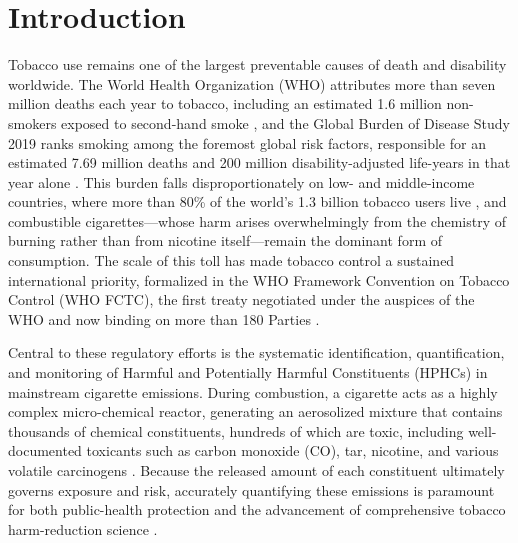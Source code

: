 ﻿\documentclass[a4paper,fleqn]{cas-sc}
\begin{document}
\maketitle


\section{Introduction}

Tobacco use remains one of the largest preventable causes of death and disability worldwide. The World Health Organization (WHO) attributes more than seven million deaths each year to tobacco, including an estimated 1.6 million non-smokers exposed to second-hand smoke \cite{who2025tobacco}, and the Global Burden of Disease Study 2019 ranks smoking among the foremost global risk factors, responsible for an estimated 7.69 million deaths and 200 million disability-adjusted life-years in that year alone \cite{gbd2019tobacco}. This burden falls disproportionately on low- and middle-income countries, where more than 80\% of the world's 1.3 billion tobacco users live \cite{who2025tobacco}, and combustible cigarettes---whose harm arises overwhelmingly from the chemistry of burning rather than from nicotine itself---remain the dominant form of consumption. The scale of this toll has made tobacco control a sustained international priority, formalized in the WHO Framework Convention on Tobacco Control (WHO FCTC), the first treaty negotiated under the auspices of the WHO and now binding on more than 180 Parties \cite{who2003fctc}.

Central to these regulatory efforts is the systematic identification, quantification, and monitoring of Harmful and Potentially Harmful Constituents (HPHCs) in mainstream cigarette emissions. During combustion, a cigarette acts as a highly complex micro-chemical reactor, generating an aerosolized mixture that contains thousands of chemical constituents, hundreds of which are toxic, including well-documented toxicants such as carbon monoxide (CO), tar, nicotine, and various volatile carcinogens \cite{BAKER2006373, ijerph8020613, Hecht2003TobaccoCarcinogens}. Because the released amount of each constituent ultimately governs exposure and risk, accurately quantifying these emissions is paramount for both public-health protection and the advancement of comprehensive tobacco harm-reduction science \cite{Burns2008WHO, HAMMOND2006781, MURPHY2017342}.
\end{document}
